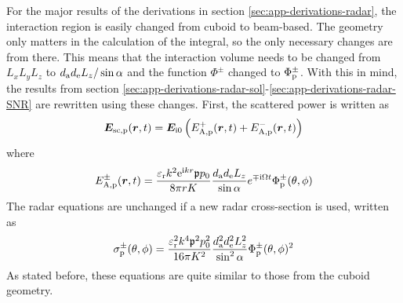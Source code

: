 \documentclass[11pt,twoside]{eitExjobb}
\begin{document}
	For the major results of the derivations in section \ref{sec:app-derivations-radar}, the interaction region is easily changed from cuboid to beam-based. The geometry only matters in the calculation of the integral, so the only necessary changes are from there. This means that the interaction volume needs to be changed from $L_{x} L_{y} L_{z}$ to $d_{\mathrm{a}} d_{\mathrm{e}} L_{z}/\sin{\alpha}$ and the function $\Phi^\pm$ changed to $\Phi_{\mathrm{p}}^\pm$.  With this in mind, the results from section \ref{sec:app-derivations-radar-sol}-\ref{sec:app-derivations-radar-SNR} are rewritten using these changes. First, the scattered power is written as
	\begin{equation*}
		\bm{E}_{\mathrm{sc,p}} (\bm{r},t) = \bm{E}_{\mathrm{i}0} \left( E_{\mathrm{A,p}}^+ (\bm{r},t) + E_{\mathrm{A,p}}^- (\bm{r},t) \right)
	\end{equation*}
	where
	\begin{equation*}
		E_{\mathrm{A,p}}^\pm (\bm{r},t) = \frac{\varepsilon_{\mathrm{r}}k^2 \mathrm{e}^{\mathrm{i} kr} \mathfrak{p} p_0}{8\pi r K} \frac{d_{\mathrm{a}} d_{\mathrm{e}} L_{z}}{\sin{\alpha}} e^{\mp \mathrm{i} \Omega t} \Phi_{\mathrm{p}}^\pm (\theta,\phi)
	\end{equation*}
	The radar equations are unchanged if a new radar cross-section is used, written as
	\begin{equation*}
		\sigma_{\mathrm{p}}^\pm (\theta, \phi) = \frac{\varepsilon_{\mathrm{r}}^2 k^4 \mathfrak{p}^2 p_0^2}{16\pi K^2} \frac{d_{\mathrm{a}}^2 d_{\mathrm{e}}^2 L_{z}^2}{\sin^2{\alpha}} \Phi_{\mathrm{p}}^\pm (\theta,\phi)^2
	\end{equation*}
	As stated before, these equations are quite similar to those from the cuboid geometry.
	
\end{document}
